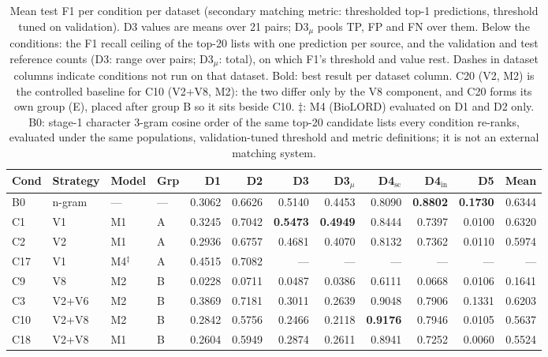 \begin{table}[t]
\scriptsize
\setlength{\tabcolsep}{4pt}
\begin{threeparttable}
\caption{Mean test F1 per condition per dataset (secondary matching metric: thresholded top-1 predictions, threshold tuned on validation). D3 values are means over 21 pairs; D3$_{\mu}$ pools TP, FP and FN over them. Below the conditions: the F1 recall ceiling of the top-20 lists with one prediction per source, and the validation and test reference counts (D3: range over pairs; D3$_{\mu}$: total), on which F1's threshold and value rest. Dashes in dataset columns indicate conditions not run on that dataset. Bold: best result per dataset column. C20 (V2, M2) is the controlled baseline for C10 (V2+V8, M2): the two differ only by the V8 component, and C20 forms its own group (E), placed after group B so it sits beside C10. $\ddagger$: M4 (BioLORD) evaluated on D1 and D2 only. B0: stage-1 character 3-gram cosine order of the same top-20 candidate lists every condition re-ranks, evaluated under the same populations, validation-tuned threshold and metric definitions; it is not an external matching system.}
\label{tab:matching_f1}
\begin{tabular}{llllrrrrrrrr}
\hline
\textbf{Cond} & \textbf{Strategy} & \textbf{Model} & \textbf{Grp} & \textbf{D1} & \textbf{D2} & \textbf{D3} & \textbf{D3$_{\mu}$} & \textbf{D4$_{\mathrm{sc}}$} & \textbf{D4$_{\mathrm{in}}$} & \textbf{D5} & \textbf{Mean\tnote{*}} \\
\hline
B0 & n-gram & --- & --- & 0.3062 & 0.6626 & 0.5140 & 0.4453 & 0.8090 & \textbf{0.8802} & \textbf{0.1730} & 0.6344 \\
\hline
C1 & V1 & M1 & A & 0.3245 & 0.7042 & \textbf{0.5473} & \textbf{0.4949} & 0.8444 & 0.7397 & 0.0100 & 0.6320 \\
C2 & V2 & M1 & A & 0.2936 & 0.6757 & 0.4681 & 0.4070 & 0.8132 & 0.7362 & 0.0110 & 0.5974 \\
C17 & V1 & M4$^\ddagger$ & A & 0.4515 & 0.7082 & --- & --- & --- & --- & --- & --- \\
\hline
C9 & V8 & M2 & B & 0.0228 & 0.0711 & 0.0487 & 0.0386 & 0.6111 & 0.0668 & 0.0106 & 0.1641 \\
C3 & V2+V6 & M2 & B & 0.3869 & 0.7181 & 0.3011 & 0.2639 & 0.9048 & 0.7906 & 0.1331 & 0.6203 \\
C10 & V2+V8 & M2 & B & 0.2842 & 0.5756 & 0.2466 & 0.2118 & \textbf{0.9176} & 0.7946 & 0.0105 & 0.5637 \\
C18 & V2+V8 & M1 & B & 0.2604 & 0.5949 & 0.2874 & 0.2611 & 0.8941 & 0.7252 & 0.0060 & 0.5524 \\

\end{tabular}
\end{threeparttable}
\end{table}
